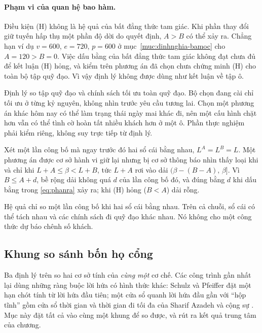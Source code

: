 \paragraph{Phạm vi của quan hệ bao hàm.}
Điều kiện (H) không là hệ quả của bất đẳng thức tam giác. Khi phần thay đổi giữ tuyến hấp thụ
một phần độ dời do quyết định, $A>B$ có thể xảy ra. Chẳng hạn ví dụ $v=600$, $e=720$,
$p=600$ ở mục~\ref{muc:dinhnghia-bamoc} cho $A=120>B=0$. Việc dấu bằng của bất đẳng thức
tam giác không đạt chưa đủ để kết luận (H) hỏng, và kiểm trên phương án đã chọn chưa chứng
minh (H) cho toàn bộ tập quỹ đạo. Vì vậy định lý không được dùng như kết luận về tập ô.

Định lý so tập quỹ đạo và chính sách tối ưu toàn quỹ đạo. Bộ chọn đang cài chỉ tối ưu ở từng
kỷ nguyên, không nhìn trước yêu cầu tương lai. Chọn một phương án khác hôm nay có thể làm
trạng thái ngày mai khác đi, nên một cấu hình chặt hơn vẫn có thể tình cờ hoàn tất nhiều
khách hơn ở một ô. Phần thực nghiệm phải kiểm riêng, không suy trực tiếp từ định lý.

\begin{hequa}

Xét một lần công bố mà ngay trước đó hai sổ cái bằng nhau, $L^{A} = L^{B} = L$. Một phương án được
cơ sở hành vi giữ lại nhưng bị cơ sở thông báo nhìn thấy loại khi và chỉ khi $L + A \le \beta < L + B$, tức
$L + A$ rơi vào dải $(\beta - (B - A),\, \beta]$. Vì $B \le A + d$, bề rộng dải không quá $d$ của
lần công bố đó, và đúng bằng $d$ khi dấu bằng trong \eqref{eq:phanra} xảy ra; khi (H) hỏng
($B < A$) dải rỗng.
\end{hequa}

Hệ quả chỉ so một lần công bố khi hai sổ cái bằng nhau. Trên cả chuỗi, sổ cái có thể tách
nhau và các chính sách đi quỹ đạo khác nhau. Nó không cho một công thức dự báo chênh số khách.

\subsection{Khung so sánh bốn họ cổng}


Ba định lý trên so hai cơ sở tính của \emph{cùng một} cơ chế. Các công trình gần nhất lại dùng
những ràng buộc lời hứa có hình thức khác: Schulz và Pfeiffer \cite{schulz2026} đặt một hạn chót
tính từ lời hứa đầu tiên; một cửa sổ quanh lời hứa đầu gần với ``hộp tĩnh'' gồm cửa sổ thời gian
và thời gian đi tối đa của Sharif Azadeh và cộng sự \cite{sharifazadeh2022}. Mục này đặt tất cả
vào cùng một khung để so được, và rút ra kết quả trung tâm của chương.

